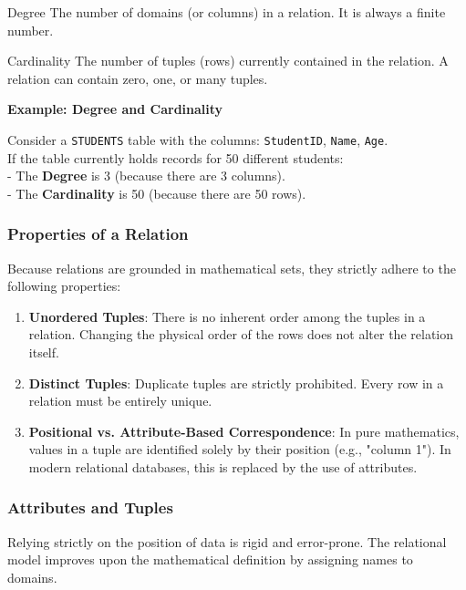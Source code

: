\begin{defbox}{Degree}
The number of domains (or columns) in a relation. It is always a finite number.
\end{defbox}

\begin{defbox}{Cardinality}
The number of tuples (rows) currently contained in the relation. A relation can contain zero, one, or many tuples.
\end{defbox}

\vspace{0.2cm}
\begin{example}{\textbf{Example: Degree and Cardinality}}

Consider a \texttt{STUDENTS} table with the columns: \texttt{StudentID}, \texttt{Name}, \texttt{Age}.\\
If the table currently holds records for 50 different students:\\
- The \textbf{Degree} is 3 (because there are 3 columns).\\
- The \textbf{Cardinality} is 50 (because there are 50 rows).
\end{example}

\subsubsection{Properties of a Relation}
Because relations are grounded in mathematical sets, they strictly adhere to the following properties:

\begin{enumerate}
\item \textbf{Unordered Tuples}: 
There is no inherent order among the tuples in a relation. Changing the physical order of the rows does not alter the relation itself.

\vspace{0.2cm}

\item \textbf{Distinct Tuples}: 
Duplicate tuples are strictly prohibited. Every row in a relation must be entirely unique.
\vs

\item \textbf{Positional vs. Attribute-Based Correspondence}: 
In pure mathematics, values in a tuple are identified solely by their position (e.g., "column 1"). In modern relational databases, this is replaced by the use of attributes.
\end{enumerate}


\subsubsection{Attributes and Tuples}
Relying strictly on the position of data is rigid and error-prone. The relational model improves upon the mathematical definition by assigning names to domains.

